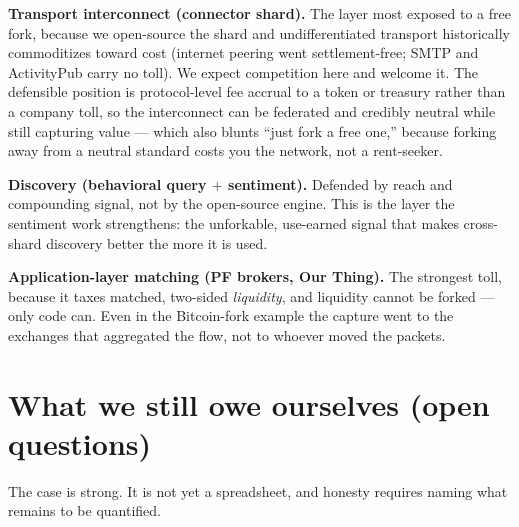 \documentclass[11pt]{article}
\begin{document}
\textbf{Transport interconnect (connector shard).} The layer most exposed to a free fork, because we open-source the shard and undifferentiated transport historically commoditizes toward cost (internet peering went settlement-free; SMTP and ActivityPub carry no toll). We expect competition here and welcome it. The defensible position is protocol-level fee accrual to a token or treasury rather than a company toll, so the interconnect can be federated and credibly neutral while still capturing value --- which also blunts ``just fork a free one,'' because forking away from a neutral standard costs you the network, not a rent-seeker.

\textbf{Discovery (behavioral query $+$ sentiment).} Defended by reach and compounding signal, not by the open-source engine. This is the layer the sentiment work strengthens: the unforkable, use-earned signal that makes cross-shard discovery better the more it is used.

\textbf{Application-layer matching (PF brokers, Our Thing).} The strongest toll, because it taxes matched, two-sided \emph{liquidity}, and liquidity cannot be forked --- only code can. Even in the Bitcoin-fork example the capture went to the exchanges that aggregated the flow, not to whoever moved the packets.

\section{What we still owe ourselves (open questions)}\label{sec:open}

The case is strong. It is not yet a spreadsheet, and honesty requires naming what remains to be quantified.
\end{document}
